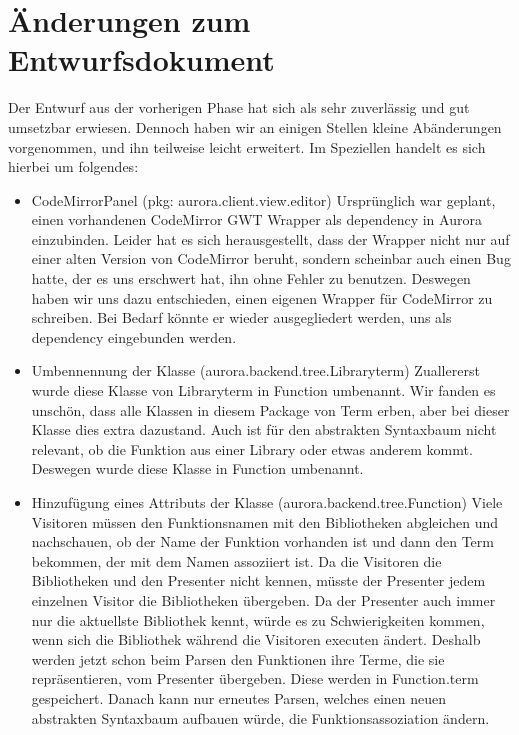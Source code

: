 \documentclass[parskip=full,11pt,twoside]{scrartcl}
\begin{document}
\section{Änderungen zum Entwurfsdokument}
Der Entwurf aus der vorherigen Phase hat sich als sehr zuverlässig und gut umsetzbar erwiesen.
Dennoch haben wir an einigen Stellen kleine Abänderungen vorgenommen, und ihn teilweise leicht erweitert.
Im Speziellen handelt es sich hierbei um folgendes:
\begin{itemize}
    \item CodeMirrorPanel (pkg: aurora.client.view.editor)
    \newline
    Ursprünglich war geplant, einen vorhandenen CodeMirror GWT Wrapper als dependency in Aurora einzubinden.
    Leider hat es sich herausgestellt, dass der Wrapper nicht nur auf einer alten Version von CodeMirror beruht, sondern scheinbar auch einen Bug hatte, der es uns erschwert hat, ihn ohne Fehler zu benutzen.
    Deswegen haben wir uns dazu entschieden, einen eigenen Wrapper für CodeMirror zu schreiben.
    Bei Bedarf könnte er wieder ausgegliedert werden, uns als dependency eingebunden werden.

	\item Umbennennung der Klasse (aurora.backend.tree.Libraryterm)
	\newline
	Zuallererst wurde diese Klasse von Libraryterm in Function umbenannt. Wir fanden es unschön, dass alle Klassen in
	diesem Package von Term erben, aber bei dieser Klasse dies extra dazustand. Auch ist für den abstrakten Syntaxbaum
	nicht relevant, ob die Funktion aus einer Library oder etwas anderem kommt. Deswegen wurde diese Klasse in Function
	umbenannt.

	\item Hinzufügung eines Attributs der Klasse (aurora.backend.tree.Function)
	\newline
	Viele Visitoren müssen den Funktionsnamen mit den Bibliotheken abgleichen und nachschauen, ob der Name der Funktion
	vorhanden ist und dann den Term bekommen, der mit dem Namen assoziiert ist. Da die Visitoren die Bibliotheken und
	den Presenter nicht kennen, müsste der 	Presenter jedem einzelnen Visitor die Bibliotheken übergeben. Da der
	Presenter auch immer nur die aktuellste Bibliothek kennt, würde es zu Schwierigkeiten kommen, wenn sich die
	Bibliothek während die Visitoren executen ändert.
	Deshalb werden jetzt schon beim Parsen den Funktionen ihre Terme, die sie repräsentieren, vom Presenter übergeben.
	Diese werden in Function.term gespeichert. Danach kann nur erneutes Parsen, welches einen neuen abstrakten
	Syntaxbaum aufbauen würde, die Funktionsassoziation ändern.


\end{itemize}
\end{document}
